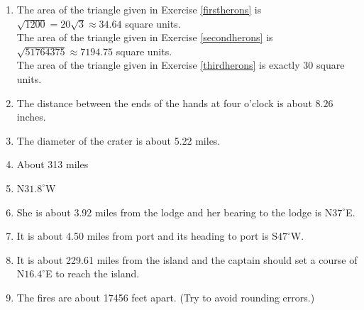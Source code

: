 \begin{enumerate}
\setcounter{enumi}{\value{HW}}
\item The area of the triangle given in Exercise \ref{firstherons} is $\sqrt{1200} = 20\sqrt{3} \approx 34.64$ square units.\\
The area of the triangle given in Exercise \ref{secondherons} is $\sqrt{51764375} \approx 7194.75$ square units.\\
The area of the triangle given in Exercise \ref{thirdherons} is exactly $30$ square units.

\item The distance between the ends of the hands at four o'clock is about $8.26$ inches.

\item  The diameter of the crater is about 5.22 miles.

\item About 313 miles

\item N$31.8^{\circ}$W

\item She is about 3.92 miles from the lodge and her bearing to the lodge is N$37^{\circ}$E. 

\item  It is about 4.50 miles from port and its heading to port is S$47^{\circ}$W.

\item  It is about 229.61 miles from the island and the captain should set a course of N$16.4^{\circ}$E to reach the island.

\item The fires are about 17456 feet apart. (Try to avoid rounding errors.)

\end{enumerate}

